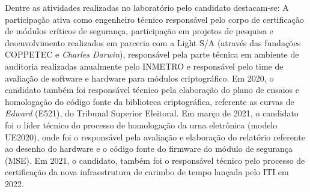 Dentre as atividades realizadas no laboratório pelo candidato destacam-se: A participação ativa como 
engenheiro técnico responsável pelo corpo de certificação de módulos críticos de segurança, participação 
em projetos de pesquisa e desenvolvimento realizados em parceria com a Light S/A (através das fundações 
COPPETEC e \emph{Charles Darwin}), responsável pela parte técnica em ambiente de auditoria realizadas anualmente 
pelo INMETRO e responsável pelo time de avaliação de software e hardware para módulos criptográfico. 
Em 2020, o candidato também foi responsável técnico pela elaboração do plano de ensaios e homologação 
do código fonte da biblioteca criptográfica, referente as curvas de \emph{Edward} (E521), do Tribunal Superior 
Eleitoral. Em março de 2021, o candidato foi o líder técnico do processo de homologação da urna 
eletrônica (modelo UE2020), onde foi o responsável pela avaliação e elaboração do relatório referente 
ao desenho do hardware e o código fonte do firmware do módulo de segurança (MSE). Em 2021, o 
candidato, também foi o responsável técnico pelo processo de certificação da nova infraestrutura 
de carimbo de tempo lançada pelo ITI em 2022.








